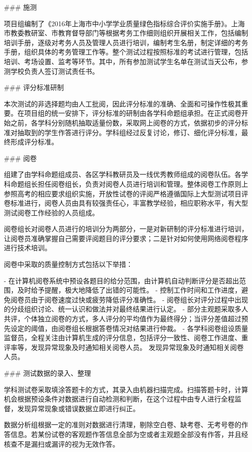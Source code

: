 ### 施测

项目组编制了《2016年上海市中小学学业质量绿色指标综合评价实施手册》。上海市教委教研室、市教育督导部门等根据考务工作细则组织开展相关工作，包括编制培训手册，逐级对考务人员及管理人员进行培训，编制考生名册，制定详细的考务手册，组织具体的考务管理工作等。整个测试过程按照标准的考试进行管理，包括培训、考场设置、监考等环节。其中，所有参加测试学生名单在测试当天公布，参测学校负责人签订测试责任书。

### 评分标准研制

本次测试的非选择题均由人工批阅，因此评分标准的准确、全面和可操作性极其重要。在项目组的统一安排下，评分标准的研制由各学科命题组承担。在正式阅卷开始之前，各学科分别随机抽取适量份数，采取网上阅卷的方式，依据初步的评分标准对抽取到的学生作答进行评分。学科组经过反复讨论，修订、细化评分标准，最终形成评分标准。

### 阅卷

组建了由学科命题组成员、各区学科教研员及一线优秀教师组成的阅卷队伍。各学科命题组长担任阅卷组长，负责对阅卷人员进行培训和管理。整体阅卷工作原则上参照高考的相应要求组织实施，开放性试卷的评阅严格遵循国际上大型测试项目评卷标准进行，阅卷人员由具有较强责任心，丰富教学经验，相应职称水平，有大型测试阅卷工作经验的人员组成。


阅卷组长对阅卷人员进行的培训分为两部分，一是对新研制的评分标准进行培训，让阅卷员准确掌握自己需要评阅题目的评分要求；二是针对如何使用网络阅卷程序进行技术培训。


阅卷中采取的质量控制方式包括以下举措：


\mylist

- 在计算机阅卷系统中预设各题目的给分范围，由计算机自动判断评分是否超出范围，及时给予提醒，极大地降低了出错的可能性。
- 控制工作时间和工作进度，避免阅卷员由于阅卷速度过快或疲劳降低评分准确性。
- 阅卷组长对评分过程中出现的分歧组织讨论、统一认识和做法并对最终结果进行认定。
- 部分主观题采取多人共评，个体独立阅卷的方式，多人评分的平均值作为最终得分；当评分差值超过预先设定的阈值，由阅卷组长根据答卷情况对结果进行仲裁。
- 各学科阅卷组设质量监督员，全程关注由计算机生成的评分信息，包括评分一致性、阅卷工作进度、重评率等，发现异常现象及时通知相关阅卷人员。
发现异常现象及时通知相关阅卷人员。

\mytext

### 测试数据的录入、整理

学科测试卷采取填涂答题卡的方式，其录入由机器扫描完成。扫描答题卡时，计算机会根据预设条件对数据进行自动检测和判断，在这个过程中由专人进行全程监督，发现异常现象或错误数据立即进行纠正。

数据分析组根据一定的准则对数据进行清理，剔除空白卷、缺考卷、无考号卷的作答信息。若某份试卷的客观题作答信息全部为空或者主观题全部没有作答，并且经核查不是漏扫或漏评的视为无效作答。



